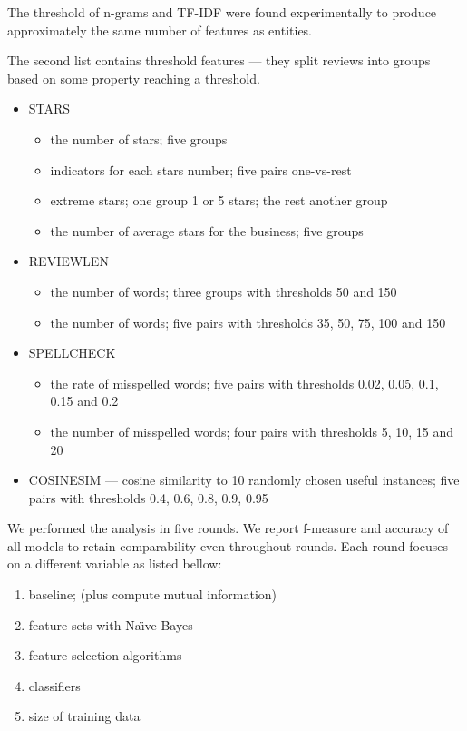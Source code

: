The threshold of n-grams and TF-IDF were found experimentally to produce approximately the same number of features as entities.

The second list contains threshold features --- they split reviews into groups based on some property reaching a threshold.

\begin{itemize}
	\item STARS 
		\begin{itemize}
			\item the number of stars; five groups
			\item indicators for each stars number; five pairs one-vs-rest
			\item extreme stars; one group 1 or 5 stars; the rest another group
			\item the number of average stars for the business; five groups
		\end{itemize}
	\item REVIEWLEN 
		\begin{itemize}
			\item the number of words; three groups with thresholds 50 and 150
			\item the number of words; five pairs with thresholds 35, 50, 75, 100 and 150
		\end{itemize}
	\item SPELLCHECK 
		\begin{itemize}
			\item the rate of misspelled words; five pairs with thresholds 0.02, 0.05, 0.1, 0.15 and 0.2
			\item the number of misspelled words; four pairs with thresholds 5, 10, 15 and 20
		\end{itemize}
	
	\item COSINESIM --- cosine similarity to 10 randomly chosen useful instances; five pairs with thresholds 0.4, 0.6, 0.8, 0.9, 0.95
\end{itemize}

We performed the analysis in five rounds.
We report f-measure and accuracy of all models to retain comparability even throughout rounds.
Each round focuses on a different variable as listed bellow:

\begin{enumerate}
	\item baseline; (plus compute mutual information)
	\item feature sets with Na\"{\i}ve Bayes
	\item feature selection algorithms
	\item classifiers
	\item size of training data
\end{enumerate}



